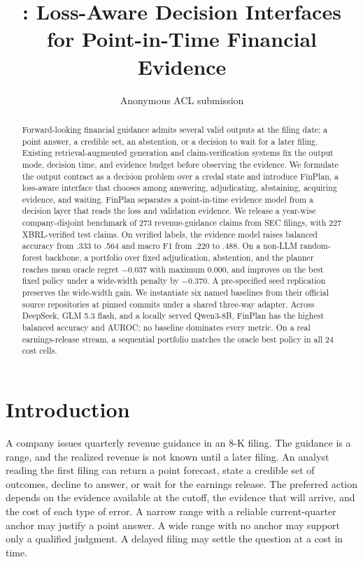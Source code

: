 \documentclass[11pt]{article}
\title{\method: Loss-Aware Decision Interfaces for Point-in-Time Financial Evidence}
\author{Anonymous ACL submission}
\newcommand{\method}{FinPlan}
\begin{document}
\sloppy
\maketitle

\begin{abstract}
Forward-looking financial guidance admits several valid outputs at the filing date: a point answer, a credible set, an abstention, or a decision to wait for a later filing. Existing retrieval-augmented generation and claim-verification systems fix the output mode, decision time, and evidence budget before observing the evidence. We formulate the output contract as a decision problem over a credal state and introduce \method, a loss-aware interface that chooses among answering, adjudicating, abstaining, acquiring evidence, and waiting. \method{} separates a point-in-time evidence model from a decision layer that reads the loss and validation evidence. We release a year-wise company-disjoint benchmark of 273 revenue-guidance claims from SEC filings, with 227 XBRL-verified test claims. On verified labels, the evidence model raises balanced accuracy from .333 to .564 and macro F1 from .220 to .488. On a non-LLM random-forest backbone, a portfolio over fixed adjudication, abstention, and the planner reaches mean oracle regret $-0.037$ with maximum $0.000$, and improves on the best fixed policy under a wide-width penalty by $-0.370$. A pre-specified seed replication preserves the wide-width gain. We instantiate six named baselines from their official source repositories at pinned commits under a shared three-way adapter. Across DeepSeek, GLM 5.3 flash, and a locally served Qwen3-8B, \method{} has the highest balanced accuracy and AUROC; no baseline dominates every metric. On a real earnings-release stream, a sequential portfolio matches the oracle best policy in all 24 cost cells.
\end{abstract}

\section{Introduction}

A company issues quarterly revenue guidance in an 8-K filing. The guidance is a range, and the realized revenue is not known until a later filing. An analyst reading the first filing can return a point forecast, state a credible set of outcomes, decline to answer, or wait for the earnings release. The preferred action depends on the evidence available at the cutoff, the evidence that will arrive, and the cost of each type of error. A narrow range with a reliable current-quarter anchor may justify a point answer. A wide range with no anchor may support only a qualified judgment. A delayed filing may settle the question at a cost in time.
\end{document}
